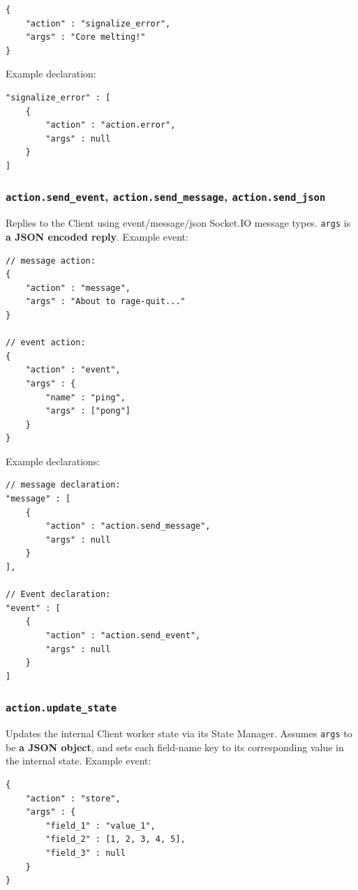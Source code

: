 \documentclass[a4paper]{article}
\begin{document}
\begin{verbatim}
{
    "action" : "signalize_error",
    "args" : "Core melting!"
}
\end{verbatim}




\noindent
Example declaration:

\begin{verbatim}
"signalize_error" : [
    {
        "action" : "action.error",
        "args" : null
    }
]
\end{verbatim}
\subsubsection{\texttt{action.send\_event}, \texttt{action.send\_message}, \texttt{action.send\_json}}
\label{sec-9-3-3}

Replies to the Client using event/message/json Socket.IO message types. \texttt{args} is \textbf{a JSON encoded reply}. Example event:

\begin{verbatim}
// message action:
{
    "action" : "message",
    "args" : "About to rage-quit..."
}

// event action:
{
    "action" : "event",
    "args" : {
        "name" : "ping",
        "args" : ["pong"]
    }
}
\end{verbatim}




\noindent
Example declarations:

\begin{verbatim}
// message declaration:
"message" : [
    {
        "action" : "action.send_message",
        "args" : null
    }
],

// Event declaration:
"event" : [
    {
        "action" : "action.send_event",
        "args" : null
    }
]
\end{verbatim}
\subsubsection{\texttt{action.update\_state}}
\label{sec-9-3-4}

Updates the internal Client worker state via its State Manager. Assumes \texttt{args} to be \textbf{a JSON object}, and sets each field-name key to its corresponding value in the internal state. Example event:

\begin{verbatim}
{
    "action" : "store",
    "args" : {
        "field_1" : "value_1",
        "field_2" : [1, 2, 3, 4, 5],
        "field_3" : null
    }
}
\end{verbatim}
\end{document}
